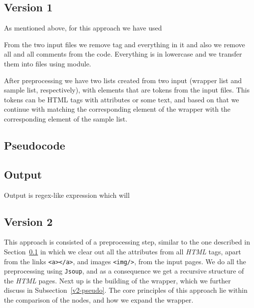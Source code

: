 \documentclass{article}
\begin{document}
	\subsection{Version 1}\label{v1}
	\cite{crescenzi2001roadrunner} %
	As mentioned above, for this approach we have used 
	
	From the two input  files we remove  tag and everything in it and also we remove all  and all comments from the code. Everything is in lowercase and we transfer them into  files using  module. 
	
	After preprocessing we have two lists created from two input  (wrapper list and sample list, respectively), with elements that are tokens from the input  files. This tokens can be HTML tags with attributes or some text, and based on that we continue with matching the corresponding element of the wrapper with the corresponding element of the sample list. 
	
	
	
	\subsection{Pseudocode}
	
	
	
	
	\subsection{Output}
	Output is regex-like expression which will 
	
	
	
	
	\subsection{}
	\subsection{}
	
	
	
	
	
	
	
	
	
	
	
	
	
	\subsection{Version 2}\label{v2}
	This approach is consisted of a preprocessing step, similar to the one described in Section~\ref{v1}  in which we clear out all the attributes from all \textit{HTML} tags, apart from the links \texttt{<a></a>}, and images \texttt{<img/>}, from the input pages. We do all the preprocessing using \texttt{Jsoup}, and as a consequence we get a recursive structure of the \textit{HTML} pages. Next up is the building of the wrapper, which we further discuss in Subsection~\ref{v2-pseudo}. The core principles of this approach lie within the comparison of the nodes, and how we expand the wrapper.
	
\end{document}
